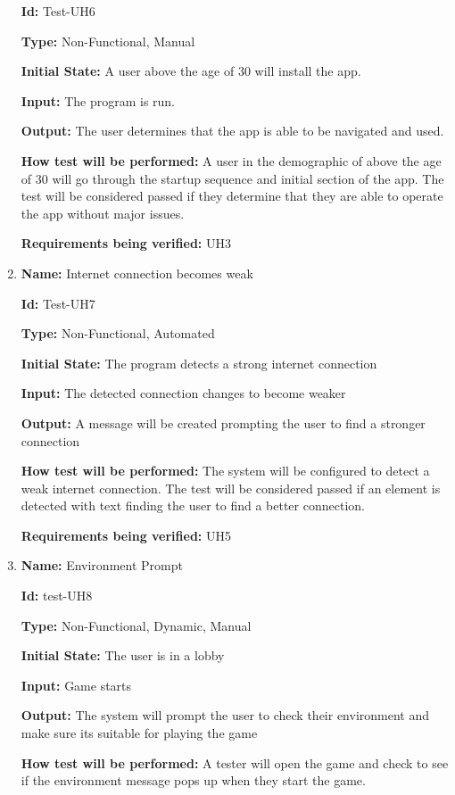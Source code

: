 \documentclass[12pt, titlepage]{article}
\begin{document}
\begin{enumerate}
\textbf{Id:} Test-UH6

\textbf{Type:} Non-Functional, Manual
					
\textbf{Initial State:} A user above the age of 30 will install the app.
					
\textbf{Input:} The program is run.
					
\textbf{Output:} The user determines that the app is able to be navigated and used.
					
\textbf{How test will be performed:} A user in the demographic of above the age of 30 will go through the startup sequence and initial section of the app. The test will be considered passed if they determine that they are able to operate the app without major issues. 

\textbf{Requirements being verified:} UH3

\item{\textbf{Name:} Internet connection becomes weak}

\textbf{Id:} Test-UH7

\textbf{Type:} Non-Functional, Automated
					
\textbf{Initial State:} The program detects a strong internet connection
					
\textbf{Input:} The detected connection changes to become weaker
					
\textbf{Output:} A message will be created prompting the user to find a stronger connection
					
\textbf{How test will be performed:} The system will be configured to detect a weak internet connection. The test will be considered passed if an element is detected with text finding the user to find a better connection.

\textbf{Requirements being verified:} UH5

\item{\textbf{Name:} Environment Prompt }

\textbf{Id:} test-UH8

\textbf{Type:} Non-Functional, Dynamic, Manual
					
\textbf{Initial State:} The user is in a lobby
					
\textbf{Input:} Game starts
					
\textbf{Output:} The system will prompt the user to check their environment and make sure its suitable for playing the game
					
\textbf{How test will be performed:} A tester will open the game and check to see if the environment message pops up when they start the game. 


\end{enumerate}
\end{document}
